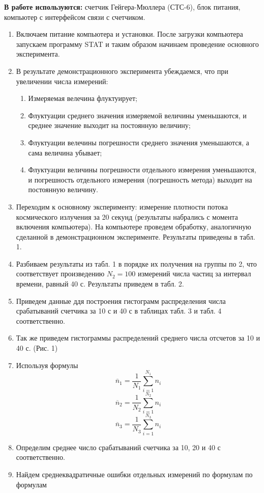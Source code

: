 \documentclass[a4paper, 12pt]{article}%
\begin{document}
\textbf{В работе используются:} счетчик Гейгера-Мюллера (СТС-6), блок питания, компьютер с интерфейсом связи с счетчиком.
\begin{enumerate}
\item Включаем питание компьютера и установки. После загрузки компьютера запускаем программу STAT и таким образом начинаем проведение основного эксперимента. 
\item В результате демонстрационного эксперимента убеждаемся, что при увеличении числа измерений:
\begin{enumerate}
\item Измеряемая велечина флуктуирует;
\item Флуктуации среднего значения измеряемой величины уменьшаются, и среднее значение выходит на постоянную величину;
\item Флуктуации велечины погрешности среднего значения уменьшаются, а сама величина убывает;
\item Флуктуации величины погрешности отдельного измерения уменьшаются, и погрешность отдельного измерения (погрешность метода) выходит на постоянную величину.
\end{enumerate}
\item Переходим к основному эксперименту: измерение плотности потока космического излучения за 20 секунд (результаты набрались с момента включения компьютера). На компьютере проведем обработку, аналогичную сделанной в демонстрационном эксперименте. Результаты приведены в табл. 1.
\item Разбиваем результаты из табл. 1 в порядке их получения на группы по 2, что соответствует произведению $N_2 = 100$ измерений числа частиц за интервал времени, равный 40 с. Результаты приведем в табл. 2.
\item Приведем данные ддя построения гистограмм распределения числа срабатываний счетчика за 10 с и 40 с в таблицах табл. 3 и табл. 4 соответственно. 
\item Так же приведем гистограммы распределений среднего числа отсчетов за 10 и 40 с. (Рис. 1) 
\item Используя формулы
\[ \overline{n}_1 = \dfrac{1}{N_1} \sum_{i = 1}^{N_1} {n_i} 
 \]
 \[ \overline{n}_2 = \dfrac{1}{N_2} \sum_{i = 1}^{N_2} {n_i} 
 \]
 \[ \overline{n}_3 = \dfrac{1}{N_3} \sum_{i = 1}^{N_3} {n_i} 
 \] 
\item Определим среднее число срабатываний счетчика за 10, 20 и 40 с соответственно.
\item Найдем среднеквадратичные ошибки отдельных измерений по формулам по формулам

\end{enumerate}
\end{document}
